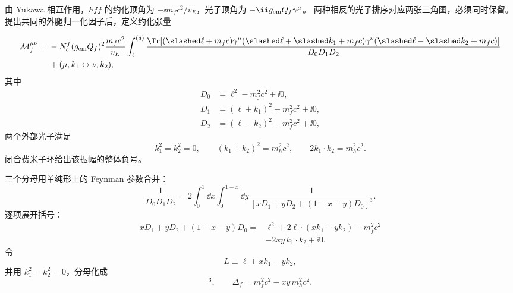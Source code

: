 \begin{derivation}
由 Yukawa 相互作用，$h f\bar f$ 的约化顶角为 $-\ii m_fc^2/v_E$，光子顶角为 $-\ii g_{\rm em}Q_f\gamma^\mu$。 两种相反的光子排序对应两张三角图，必须同时保留。 提出共同的外腿归一化因子后，定义约化张量

\begin{align*}
 \mathcal M_f^{\mu\nu}
 ={}&-N_c^f(g_{\rm em}Q_f)^2\frac{m_fc^2}{v_E}
 \int_\ell^{(d)}
 \frac{\Tr\!\left[
 (\slashed\ell+m_fc)\gamma^\mu
 (\slashed\ell+\slashed k_1+m_fc)\gamma^\nu
 (\slashed\ell-\slashed k_2+m_fc)
 \right]}
 {D_0D_1D_2}
 \nonumber\\
 &+(\mu,k_1\leftrightarrow\nu,k_2),
\end{align*}
其中
\begin{align*}
 D_0&=\ell^2-m_f^2c^2+\ii0,\\
 D_1&=(\ell+k_1)^2-m_f^2c^2+\ii0,\\
 D_2&=(\ell-k_2)^2-m_f^2c^2+\ii0,
\end{align*}
两个外部光子满足
\begin{equation*}
 k_1^2=k_2^2=0,
 \qquad
 (k_1+k_2)^2=m_h^2c^2,
 \qquad
 2k_1\!\cdot k_2=m_h^2c^2.
\end{equation*}
闭合费米子环给出该振幅的整体负号。

三个分母用单纯形上的 Feynman 参数合并：
\begin{equation*}
 \frac1{D_0D_1D_2}
 =2\int_0^1\dd x\int_0^{1-x}\dd y\,
 \frac1{[xD_1+yD_2+(1-x-y)D_0]^3}.
\end{equation*}
逐项展开括号：
\begin{align*}
 xD_1+yD_2+(1-x-y)D_0
 ={}&\ell^2+2\ell\!\cdot(xk_1-yk_2)
 -m_f^2c^2
 \\
 &-2xy\,k_1\!\cdot k_2+\ii0.
\end{align*}
令
\begin{equation*}
 L\equiv\ell+xk_1-yk_2,
\end{equation*}
并用 $k_1^2=k_2^2=0$，分母化成
\begin{equation*}
 [L^2-\Delta_f(x,y)+\ii0]^3,
 \qquad
 {\Delta_f=m_f^2c^2-xy\,m_h^2c^2.}
\end{equation*}


\end{derivation}
